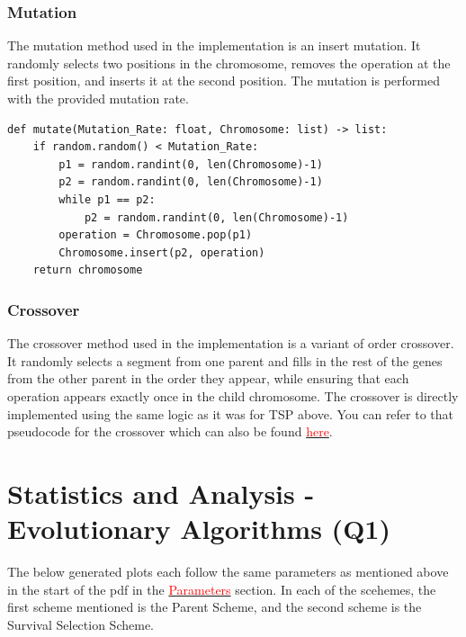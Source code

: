 \documentclass{article}
\theoremstyle{mytheoremstyle}
\theoremstyle{mytheoremstyle}
\theoremstyle{myproblemstyle}
\begin{document}
\subsubsection*{Mutation}
The mutation method used in the implementation is an insert mutation. It randomly selects two positions in the chromosome, removes the operation at the first position, and inserts it at the second position. The mutation is performed with the provided mutation rate.

\begin{lstlisting}[label=jssp_mutation, caption={Mutation Algorithm}]
def mutate(Mutation_Rate: float, Chromosome: list) -> list:
    if random.random() < Mutation_Rate:
        p1 = random.randint(0, len(Chromosome)-1)
        p2 = random.randint(0, len(Chromosome)-1)
        while p1 == p2:
            p2 = random.randint(0, len(Chromosome)-1)
        operation = Chromosome.pop(p1)
        Chromosome.insert(p2, operation)
    return chromosome
\end{lstlisting}

\subsubsection*{Crossover}
The crossover method used in the implementation is a variant of order crossover. It randomly selects a segment from one parent and fills in the rest of the genes from the other parent in the order they appear, while ensuring that each operation appears exactly once in the child chromosome. The crossover is directly implemented using the same logic as it was for TSP above. You can refer to that pseudocode for the crossover which can also be found \hyperref[tsp_crossover]{\textcolor{red}{here}}.

\newpage
\section{Statistics and Analysis - Evolutionary Algorithms (Q1)}
The below generated plots each follow the same parameters as mentioned above in the start of the pdf in the \hyperref[params]{\textcolor{red}{Parameters}} section. In each of the scehemes, the first scheme mentioned is the Parent Scheme, and the second scheme is the Survival Selection Scheme.
\end{document}
